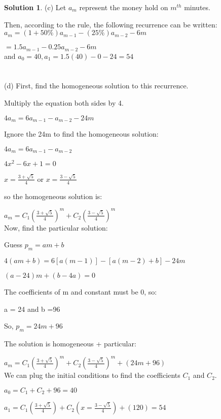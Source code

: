 \documentclass{article}
\theoremstyle{definition}
\newtheorem*{solution}{Solution}
\begin{document}
\begin{solution}

(c) Let \(a_m\) represent the money hold on \(m^{th}\) minutes.

Then, according to the rule, the following recurrence can be written:\\

\(a_m = (1+50\%)a_{m-1} - (25\%)a_{m-2} - 6m\)

  \(= 1.5a_{m-1} - 0.25a_{m-2} - 6m\)\\
  
  and \(a_0 = 40, a_1 = 1.5(40)-0-24 = 54\)\\\\\\




(d) First, find the homogeneous solution to this recurrence.

Multiply the equation both sides by 4.

\(4a_m = 6a_{m-1} - a_{m-2} - 24m\)

Ignore the 24m to find the homogeneous solution:

\(4a_m = 6a_{m-1} - a_{m-2}\)

\(4x^2 - 6x + 1 = 0\)

\(x = \frac{3 + \sqrt{5}}{4}\) or  \(x =  \frac{3 - \sqrt{5}}{4}\)

so the homogeneous solution is:

\(a_m = C_1(\frac{3 + \sqrt{5}}{4})^m + C_2(\frac{3 - \sqrt{5}}{4})^m\)\\

Now, find the particular solution:

Guess \(p_m = am + b\)

\(4(am+b) = 6[a(m -1)] -[a(m-2) + b] - 24m\)

\((a-24)m + (b-4a) = 0\)

The coefficients of m and constant must be 0, so:

a = 24 and b =96

So, \(p_m = 24m + 96\)

The solution is homogeneous + particular:

\(a_m = C_1(\frac{3 + \sqrt{5}}{4})^m + C_2(\frac{3 - \sqrt{5}}{4})^m + (24m + 96)\)\\

We can plug the initial conditions to find the coefficients \(C_1\) and \(C_2\).

\(a_0 = C_1 + C_2 + 96 = 40\)

\(a_1 = C_1(\frac{3 + \sqrt{5}}{4}) + C_2(x =  \frac{3 - \sqrt{5}}{4}) + (120) = 54\)\\


\end{solution}
\end{document}
